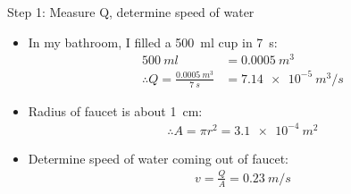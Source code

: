 \documentclass[aspectratio=169,
hyperref={colorlinks,urlcolor=blue}
]{beamer}
\begin{document}
\begin{frame}{Step 1: Measure Q, determine speed of water}
\begin{itemize}
\item In my bathroom, I filled a \SI{500}{ml} cup in \SI{7}{s}:
\begin{align*}
\SI{500}{ml} &=\SI{ 0.0005}{m^3}\\
\therefore Q=\frac {\SI{ 0.0005}{m^3}}{\SI{7}{s}}&=\SI{7.14e-5}{m^3/s}
\end{align*}
\item Radius of faucet is about \SI{1}{cm}:
\begin{align*}
\therefore A =\pi r^2=\SI{3.1e-4}{m^2}
\end{align*}
\item Determine speed of water coming out of faucet:
\begin{align*}
v=\frac{Q}{A}=\SI{0.23}{m/s}
\end{align*}
\end{itemize}
\end{frame}
\end{document}
